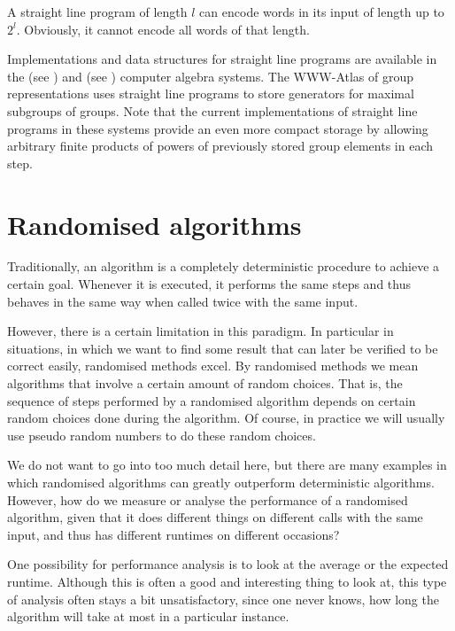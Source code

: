 \begin{Rem}
A straight line program of length $l$ can encode words in its input
of length up to $2^l$. Obviously, it cannot encode all words of that
length.
\end{Rem}

Implementations and data structures for straight line programs are
available in the {\GAP} (see \cite{GAP4}) and {\MAGMA} (see
\cite{Magma})
computer algebra systems. The
WWW-Atlas of group representations uses straight line programs to
%
store generators for maximal subgroups of groups. Note that the
current implementations of straight line programs in these systems
provide an even more compact storage by allowing arbitrary finite
products of powers of previously stored group elements in each step.


\section{Randomised algorithms}
\label{montevegas}
%

Traditionally, an algorithm is a completely deterministic procedure to
achieve a certain goal. Whenever it is executed, it performs the same
steps and thus behaves in the same way when called twice with the same input.

However, there is a certain limitation in this paradigm. In particular
in situations, in which we want to find some result that can later
be verified to be correct easily, randomised methods excel. By
randomised
methods we mean algorithms that involve a certain amount of random
choices. That is, the sequence of steps performed by a randomised
algorithm depends on certain random choices done during the algorithm.
Of course, in practice we will usually use pseudo random numbers to
do these random choices.

We do not want to go into too much detail here, but there are many
examples in which randomised algorithms can greatly outperform
deterministic algorithms. However, how do we measure or analyse
the performance of a randomised algorithm, given that it does
different things on different calls with the same input, and thus
has different runtimes on different occasions?

One possibility for performance analysis is to look at the average
or the expected runtime. Although this is often a good and
interesting thing to look at, this type of analysis often stays a
bit unsatisfactory, since one never knows, how long the algorithm will
take at most in a particular instance.

